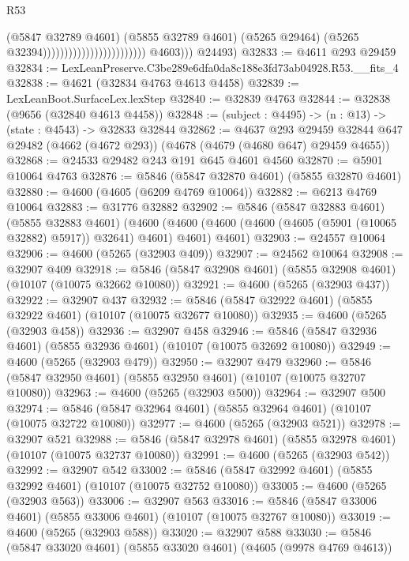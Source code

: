 \begin{lexlean}{R53}
\begin{coremodule}
                                                          (@5847 @32789 @4601)
                                                          (@5855 @32789 @4601)
                                                          (@5265 @29464)
                                                          (@5265 @32394))))))))))))))))))))))))
            @4603)))
      @24493)
@32833 := @4611 @293 @29459
@32834 := LexLeanPreserve.C3be289e6dfa0da8c188e3fd73ab04928.R53.__fits_4
@32838 := @4621 (@32834 @4763 @4613 @4458)
@32839 := LexLeanBoot.SurfaceLex.lexStep
@32840 := @32839 @4763
@32844 := @32838 (@9656 (@32840 @4613 @4458))
@32848 := (subject : @4495) -> (n : @13) -> (state : @4543) -> @32833 @32844
@32862 := @4637
    @293
    @29459
    @32844
    @647
    @29482
    (@4662 (@4672 @293))
    (@4678 (@4679 (@4680 @647) @29459 @4655))
@32868 := @24533 @29482 @243 @191 @645 @4601 @4560
@32870 := @5901 @10064 @4763
@32876 := @5846 (@5847 @32870 @4601) (@5855 @32870 @4601)
@32880 := @4600 (@4605 (@6209 @4769 @10064))
@32882 := @6213 @4769 @10064
@32883 := @31776 @32882
@32902 := @5846
    (@5847 @32883 @4601)
    (@5855 @32883 @4601)
    (@4600 (@4600 (@4600 (@4600 (@4605 (@5901 (@10065 @32882) @5917)) @32641) @4601) @4601) @4601)
@32903 := @24557 @10064
@32906 := @4600 (@5265 (@32903 @409))
@32907 := @24562 @10064
@32908 := @32907 @409
@32918 := @5846 (@5847 @32908 @4601) (@5855 @32908 @4601) (@10107 (@10075 @32662 @10080))
@32921 := @4600 (@5265 (@32903 @437))
@32922 := @32907 @437
@32932 := @5846 (@5847 @32922 @4601) (@5855 @32922 @4601) (@10107 (@10075 @32677 @10080))
@32935 := @4600 (@5265 (@32903 @458))
@32936 := @32907 @458
@32946 := @5846 (@5847 @32936 @4601) (@5855 @32936 @4601) (@10107 (@10075 @32692 @10080))
@32949 := @4600 (@5265 (@32903 @479))
@32950 := @32907 @479
@32960 := @5846 (@5847 @32950 @4601) (@5855 @32950 @4601) (@10107 (@10075 @32707 @10080))
@32963 := @4600 (@5265 (@32903 @500))
@32964 := @32907 @500
@32974 := @5846 (@5847 @32964 @4601) (@5855 @32964 @4601) (@10107 (@10075 @32722 @10080))
@32977 := @4600 (@5265 (@32903 @521))
@32978 := @32907 @521
@32988 := @5846 (@5847 @32978 @4601) (@5855 @32978 @4601) (@10107 (@10075 @32737 @10080))
@32991 := @4600 (@5265 (@32903 @542))
@32992 := @32907 @542
@33002 := @5846 (@5847 @32992 @4601) (@5855 @32992 @4601) (@10107 (@10075 @32752 @10080))
@33005 := @4600 (@5265 (@32903 @563))
@33006 := @32907 @563
@33016 := @5846 (@5847 @33006 @4601) (@5855 @33006 @4601) (@10107 (@10075 @32767 @10080))
@33019 := @4600 (@5265 (@32903 @588))
@33020 := @32907 @588
@33030 := @5846 (@5847 @33020 @4601) (@5855 @33020 @4601) (@4605 (@9978 @4769 @4613))

\end{coremodule}
\end{lexlean}

